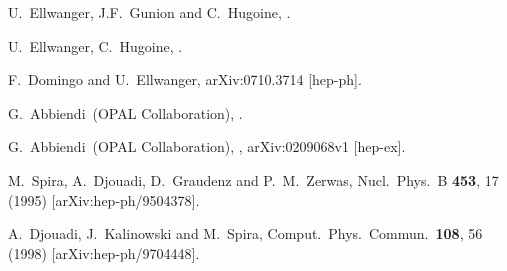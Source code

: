 \documentclass[aps,prl,twocolumn,nofootinbib,superscriptaddress]{revtex4}
\begin{document}
\begin{thebibliography}{99}







% 

 U.~Ellwanger, J.F.~Gunion and C.~Hugoine,
.

 U.~Ellwanger, C.~Hugoine, .

 F.~Domingo and U.~Ellwanger, arXiv:0710.3714 [hep-ph].

 G.~Abbiendi~\etal (OPAL Collaboration),
.

 G.~Abbiendi~\etal (OPAL Collaboration),
, arXiv:0209068v1 [hep-ex].

  M.~Spira, A.~Djouadi, D.~Graudenz and P.~M.~Zerwas,
  Nucl.\ Phys.\  B {\bf 453}, 17 (1995)
  [arXiv:hep-ph/9504378].

  A.~Djouadi, J.~Kalinowski and M.~Spira,
  Comput.\ Phys.\ Commun.\  {\bf 108}, 56 (1998)
  [arXiv:hep-ph/9704448].


\end{thebibliography}
\end{document}
